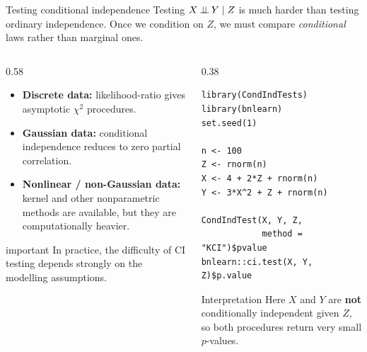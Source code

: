 \documentclass[dvipsnames,aspectratio=169,handout]{beamer}
\begin{document}
\begin{frame}[fragile]{Testing conditional independence}
Testing
$
X \mbox{\,$\perp\!\!\!\perp$\,} Y \mid Z
$
is \alert{much harder} than testing ordinary independence.
Once we condition on $Z$, we must compare \emph{conditional} laws rather than marginal ones.


\begin{columns}[T]
\begin{column}{0.58\textwidth}

\begin{block}{}
\small 
\begin{itemize}
    \item \textbf{Discrete data:} likelihood-ratio gives asymptotic $\chi^2$ procedures.\\[-2mm]
    \item \textbf{Gaussian data:} conditional independence reduces to zero partial correlation.\\[-2mm]
    \item \textbf{Nonlinear / non-Gaussian data:} kernel and other nonparametric methods are available, but they are computationally heavier.
\end{itemize}
\end{block}

\begin{beamercolorbox}[wd=\textwidth,sep=6pt,rounded=true,shadow=true]{important}\small 
In practice, the difficulty of CI testing depends strongly on the modelling assumptions.
\end{beamercolorbox}

\end{column}
\begin{column}{0.38\textwidth}

\begin{lstlisting}
library(CondIndTests)
library(bnlearn)
set.seed(1)

n <- 100
Z <- rnorm(n)
X <- 4 + 2*Z + rnorm(n)
Y <- 3*X^2 + Z + rnorm(n)

CondIndTest(X, Y, Z,
            method = "KCI")$pvalue
bnlearn::ci.test(X, Y, Z)$p.value
\end{lstlisting}
\vspace{-1mm}
\begin{alertblock}{Interpretation}
\scriptsize Here $X$ and $Y$ are \textbf{not} conditionally independent given $Z$,
so both procedures return very small $p$-values.
\end{alertblock}

\end{column}
\end{columns}

\end{frame}
\end{document}
